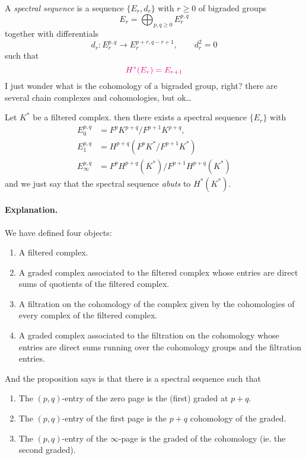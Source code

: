 \begin{definition}
\begin{definition}
	A {\it spectral sequence} is a sequence $\{E_r,d_r\}$ with $r\geq 0$ of bigraded groups
	$$E_r=\bigoplus_{p,q\geq 0} E^{p,q}_r $$
together with differentials
$$d_r:E^{p,q}_r\to E^{p+r,q-r+1}_r,\qquad d^2_r=0$$
such that
$${\color{magenta}H^{*}(E_r)=E_{r+1}}$$
{\color{magenta}I just wonder what is the cohomology of a bigraded group, right? there are several chain complexes and cohomologies, but ok…}
\end{definition}

\begin{proposition}
	Let $K^*$ be a filtered complex. then there exists a spectral sequence $\{E_r\}$ with
	\begin{align*}
		E^{p,q}_0&=F^pK^{p+q}/F^{p+1}K^{p+q},\\
		E^{p,q}_1&=H^{p+q}\left( F^pK^*/F^{p+1}K^* \right)\\
		E^{p,q}_\infty&=F^pH^{p+q}(K^*)\big/F^{p+1}H^{p+q}(K^*)
	\end{align*}
and we just say that the spectral sequence {\it abuts} to $H^{*}(K^*)$.
\end{proposition}

\paragraph{Explanation.} We have defined four objects:
\begin{enumerate}
	\item A filtered complex.
	\item A graded complex associated to the filtered complex whose entries are direct sums of quotients of the filtered complex.
	\item A filtration on the cohomology of the complex given by the cohomologies of every complex of the filtered complex.
	\item A graded complex associated to the filtration on the cohomology whose entries are direct sums running over the cohomology groups and the filtration entries.
\end{enumerate}
And the proposition says is that there is a spectral sequence such that
\begin{enumerate}
	\item The $(p,q)$-entry of the zero page is the (first) graded at $p+q$.
	\item The $(p,q)$-entry of the first page is the $p+q$ cohomology of the graded.
	\item The $(p,q)$-entry of the $\infty$-page is the graded of the cohomology
 (ie. the second graded).
\end{enumerate}


\end{definition}
